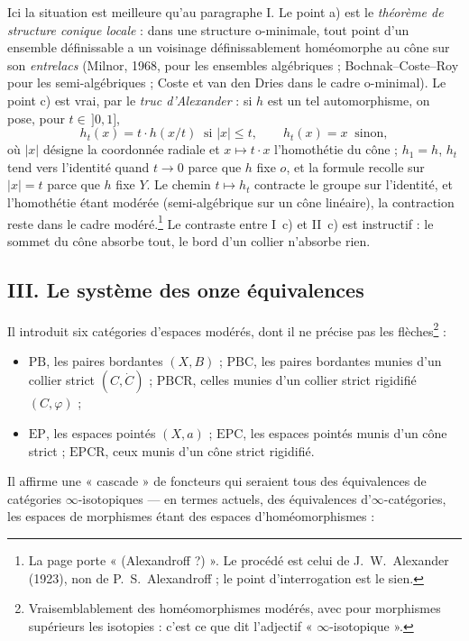 \documentclass[11pt,a4paper]{article}
\begin{document}
Ici la situation est meilleure qu'au paragraphe I. Le point a) est le
\emph{théorème de structure conique locale} : dans une structure o-minimale,
tout point d'un ensemble définissable a un voisinage définissablement
homéomorphe au cône sur son \emph{entrelacs} (Milnor, 1968, pour les
ensembles algébriques ; Bochnak--Coste--Roy pour les semi-algébriques ;
Coste et van den Dries dans le cadre o-minimal). Le point c) est vrai, par le
\emph{truc d'Alexander} : si $h$ est un tel automorphisme, on pose, pour
$t \in \,]0,1]$,
\[
  h_t(x) = t \cdot h(x / t) \ \text{ si } |x| \leqslant t, \qquad
  h_t(x) = x \ \text{ sinon},
\]
où $|x|$ désigne la coordonnée radiale et $x \mapsto t\cdot x$
l'homothétie du cône ; $h_1 = h$, $h_t$ tend vers l'identité quand $t \to 0$
parce que $h$ fixe $o$, et la formule recolle sur $|x| = t$ parce que $h$
fixe $Y$. Le chemin $t \mapsto h_t$ contracte le groupe sur l'identité, et
l'homothétie étant modérée (semi-algébrique sur un cône linéaire), la
contraction reste dans le cadre modéré.\footnote{La page porte
« (Alexandroff ?) ». Le procédé est celui de J.~W.~Alexander (1923), non de
P.~S.~Alexandroff ; le point d'interrogation est le sien.} Le contraste entre
I~c) et II~c) est instructif : le sommet du cône absorbe tout, le bord d'un
collier n'absorbe rien.

\subsection*{III. Le système des onze équivalences}

Il introduit six catégories d'espaces modérés, dont il ne précise pas les
flèches\footnote{Vraisemblablement des homéomorphismes modérés, avec pour
morphismes supérieurs les isotopies : c'est ce que dit l'adjectif
« $\infty$-isotopique ».} :
\begin{itemize}
\item $\mathrm{PB}$, les paires bordantes $(X, B)$ ; $\mathrm{PBC}$, les
  paires bordantes munies d'un collier strict $(C, \dot C)$ ;
  $\mathrm{PBCR}$, celles munies d'un collier strict rigidifié $(C,
  \varphi)$ ;
\item $\mathrm{EP}$, les espaces pointés $(X, a)$ ; $\mathrm{EPC}$, les
  espaces pointés munis d'un cône strict ; $\mathrm{EPCR}$, ceux munis d'un
  cône strict rigidifié.
\end{itemize}

Il affirme une « cascade » de foncteurs qui seraient tous des équivalences
de catégories $\infty$-isotopiques — en termes actuels, des équivalences
d'$\infty$-catégories, les espaces de morphismes étant des espaces
d'homéomorphismes :
\end{document}
